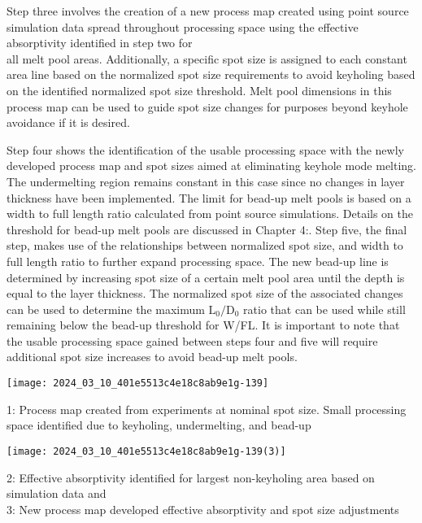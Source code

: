 \documentclass[10pt]{article}
\begin{document}
Step three involves the creation of a new process map created using point source simulation data spread throughout processing space using the effective absorptivity identified in step two for\\
all melt pool areas. Additionally, a specific spot size is assigned to each constant area line based on the normalized spot size requirements to avoid keyholing based on the identified normalized spot size threshold. Melt pool dimensions in this process map can be used to guide spot size changes for purposes beyond keyhole avoidance if it is desired.

Step four shows the identification of the usable processing space with the newly developed process map and spot sizes aimed at eliminating keyhole mode melting. The undermelting region remains constant in this case since no changes in layer thickness have been implemented. The limit for bead-up melt pools is based on a width to full length ratio calculated from point source simulations. Details on the threshold for bead-up melt pools are discussed in Chapter 4:. Step five, the final step, makes use of the relationships between normalized spot size, and width to full length ratio to further expand processing space. The new bead-up line is determined by increasing spot size of a certain melt pool area until the depth is equal to the layer thickness. The normalized spot size of the associated changes can be used to determine the maximum $\mathrm{L}_{0} / \mathrm{D}_{0}$ ratio that can be used while still remaining below the bead-up threshold for W/FL. It is important to note that the usable processing space gained between steps four and five will require additional spot size increases to avoid bead-up melt pools.

\begin{center}
\texttt{[image: 2024\_03\_10\_401e5513c4e18c8ab9e1g-139]}
\end{center}

1: Process map created from experiments at nominal spot size. Small processing space identified due to keyholing, undermelting, and bead-up

\begin{center}
\texttt{[image: 2024\_03\_10\_401e5513c4e18c8ab9e1g-139(3)]}
\end{center}

2: Effective absorptivity identified for largest non-keyholing area based on simulation data and\\
3: New process map developed effective absorptivity and spot size adjustments
\end{document}

